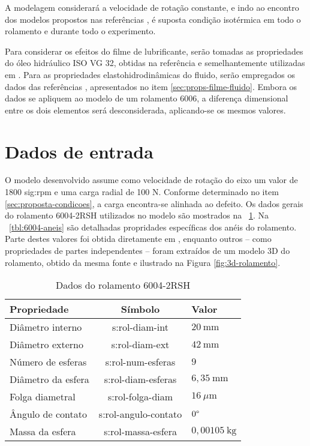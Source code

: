 \documentclass[12pt,oneside,english,brazil,lmodern,siglas,simbolos,cite=num]{ucsmonograph}
\begin{document}
	A modelagem considerará a velocidade de rotação constante, e indo ao encontro dos modelos propostos nas referências \cite{mcfadden:1984,sassi:2007,patil:2010,cong:2013,tandon:1997}, é suposta condição isotérmica em todo o rolamento e durante todo o experimento.
	
	Para considerar os efeitos do filme de lubrificante, serão tomadas as propriedades do óleo hidráulico ISO VG 32, obtidas na referência \cite{iso-vg32} e semelhantemente utilizadas em \cite{nonato:2014}.
	Para as propriedades elastohidrodinâmicas do fluido, serão empregados os dados das referências \cite{roelands:1966,nonato:2014}, apresentados no item \ref{sec:props-filme-fluido}.
	Embora os dados se apliquem ao modelo de um rolamento 6006, a diferença dimensional entre os dois elementos será desconsiderada, aplicando-se os mesmos valores.
	
	\section{Dados de entrada} \label{sec:dados-entrada}
	O modelo desenvolvido assume como velocidade de rotação do eixo um valor de 1800 \gls{sig:rpm} e uma carga radial de 100 N.
	Conforme determinado no item \ref{sec:proposta-condicoes}, a carga encontra-se alinhada ao defeito.
	Os dados gerais do rolamento 6004-2RSH utilizados no modelo são mostrados na \tablename\ \ref{tbl:6004-gerais}.
	Na \tablename\ \ref{tbl:6004-aneis} são detalhadas propridades específicas dos anéis do rolamento.
	Parte destes valores foi obtida diretamente em \cite{skf6004}, enquanto outros -- como propriedades de partes independentes -- foram extraídos de um modelo 3D do rolamento, obtido da mesma fonte e ilustrado na Figura \ref{fig:3d-rolamento}.
	
	\begin{table}[t]
	\caption{Dados do rolamento 6004-2RSH}
	\def\arraystretch{1.2}
	\centering
	\begin{tabular}{l|c|l}
	\toprule
	\textbf{Propriedade} & \textbf{Símbolo} & \textbf{Valor} \\\midrule
	Diâmetro interno & \gls{s:rol-diam-int} & $20\ \text{mm}$ \\
	Diâmetro externo & \gls{s:rol-diam-ext} & $42\ \text{mm}$ \\
	Número de esferas & \gls{s:rol-num-esferas} & $ 9 $\\
	Diâmetro da esfera & \gls{s:rol-diam-esferas} & $6,35\ \text{mm}$ \\
	Folga diametral & \gls{s:rol-folga-diam} & $ 16\ \mu\text{m} $ \\
	Ângulo de contato & \gls{s:rol-angulo-contato} & $ 0\text\textdegree$\\
	Massa da esfera & \gls{s:rol-massa-esfera} & $ 0,00105\ \text{kg} $
	\\\bottomrule
	\end{tabular}
	\label{tbl:6004-gerais}
	\end{table}
\end{document}

